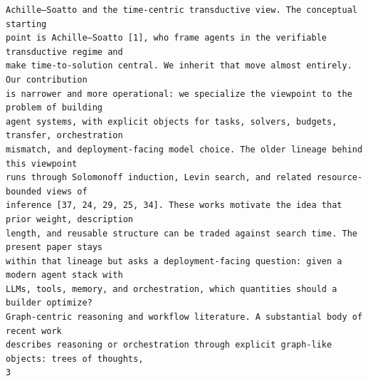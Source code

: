 \documentclass[11pt]{article}
\begin{document}
\begin{verbatim}
Achille–Soatto and the time-centric transductive view. The conceptual starting
point is Achille–Soatto [1], who frame agents in the verifiable transductive regime and
make time-to-solution central. We inherit that move almost entirely. Our contribution
is narrower and more operational: we specialize the viewpoint to the problem of building
agent systems, with explicit objects for tasks, solvers, budgets, transfer, orchestration
mismatch, and deployment-facing model choice. The older lineage behind this viewpoint
runs through Solomonoff induction, Levin search, and related resource-bounded views of
inference [37, 24, 29, 25, 34]. These works motivate the idea that prior weight, description
length, and reusable structure can be traded against search time. The present paper stays
within that lineage but asks a deployment-facing question: given a modern agent stack with
LLMs, tools, memory, and orchestration, which quantities should a builder optimize?
Graph-centric reasoning and workflow literature. A substantial body of recent work
describes reasoning or orchestration through explicit graph-like objects: trees of thoughts,
3
\end{verbatim}

\clearpage
\end{document}
